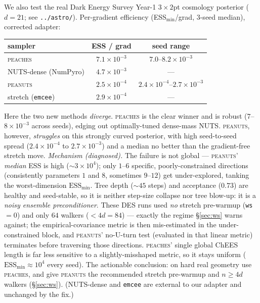 \documentclass[11pt]{article}
\begin{document}
We also test the real Dark Energy Survey Year-1 $3\times2$pt cosmology
posterior ($d{=}21$; see \texttt{../astro/}). Per-gradient efficiency
(ESS$_{\min}$/grad, 3-seed median), corrected adapter:
\begin{center}\small
\begin{tabular}{l c c}
\toprule
sampler & ESS / grad & seed range\\
\midrule
\textsc{peaches}           & $7.1\times10^{-3}$ & $7.0$--$8.2\times10^{-3}$\\
NUTS-dense (NumPyro)       & $4.7\times10^{-3}$ & ---\\
\textsc{peanuts}           & $2.5\times10^{-4}$ & $2.4\times10^{-4}$--$2.7\times10^{-3}$\\
stretch (\texttt{emcee})   & $2.9\times10^{-4}$ & ---\\
\bottomrule
\end{tabular}
\end{center}
Here the two new methods \emph{diverge}. \textsc{peaches} is the clear winner
and is robust ($7$--$8\times10^{-3}$ across seeds), edging out optimally-tuned
dense-mass NUTS. \textsc{peanuts}, however, \emph{struggles} on this strongly
curved posterior, with high seed-to-seed spread ($2.4\times10^{-4}$ to
$2.7\times10^{-3}$) and a median no better than the gradient-free stretch move.
\emph{Mechanism (diagnosed).} The failure is not global --- \textsc{peanuts}'
\emph{median} ESS is high ($\sim\!3\times10^{4}$); only $1$--$6$ specific,
poorly-constrained directions (consistently parameters $1$ and $8$, sometimes
$9$--$12$) get under-explored, tanking the worst-dimension $\text{ESS}_{\min}$.
Tree depth ($\sim\!45$ steps) and acceptance ($0.73$) are healthy and
seed-stable, so it is neither step-size collapse nor tree blow-up: it is a
\emph{noisy ensemble preconditioner}. These DES runs used \emph{no} stretch
pre-warmup (\texttt{ws}$=0$) and only $64$ walkers ($<\!4d{=}84$) --- exactly
the regime \S\ref{sec:ws} warns against; the empirical-covariance metric is
then mis-estimated in the under-constrained block, and \textsc{peanuts}'
no-U-turn test (evaluated in that linear metric) terminates before traversing
those directions. \textsc{peaches}' single global ChEES length is far less
sensitive to a slightly-misshaped metric, so it stays uniform
($\text{ESS}_{\min}\!\approx\!10^4$ every seed). The actionable conclusion:
on hard real geometry use \textsc{peaches}, and give \textsc{peanuts} the
recommended stretch pre-warmup and $n\!\ge\!4d$ walkers (\S\ref{sec:ws}).
(NUTS-dense and \texttt{emcee} are external to our adapter and unchanged by the
fix.)
\end{document}
